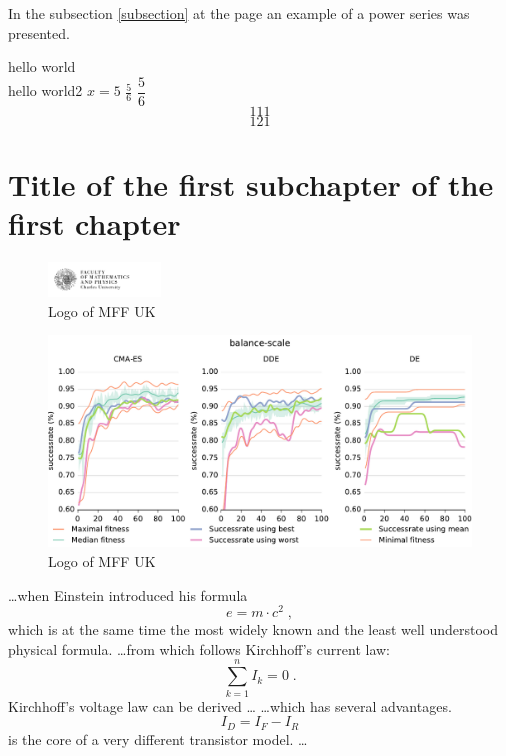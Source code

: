 \documentclass[12pt,a4paper]{report}
\begin{document}
 
In the subsection \ref{subsection} at the page \pageref{eq:1} an 
example of a power series was presented.


hello world \\ hello world2
$x=5$
$\frac{5}{6}$
$\dfrac{5}{6}$
\[111\]
$$121$$


\cite{bellet2013survey}

\section{Title of the first subchapter of the first chapter}


\begin{figure}[ht]
    \centering
    \includegraphics[width=30mm]{img/logo-en}
    \caption{Logo of MFF UK}
    \label{fig:mff}
\end{figure}


 \begin{figure}[ht] \label{fig:foo}
 	\centering
     \includegraphics[width=1.0\textwidth]{img/balance-scale}
     \caption{Logo of MFF UK}
 \end{figure}



\ldots when Einstein introduced his formula
\begin{equation}
e = m \cdot c^2 \; ,
\end{equation}
which is at the same time the most widely known
and the least well understood physical formula.
\ldots from which follows Kirchhoff’s current law:
\begin{equation}
\sum_{k=1}^{n} I_k = 0 \; .
\end{equation}
Kirchhoff’s voltage law can be derived \ldots
\ldots which has several advantages.
\begin{equation}
I_D = I_F - I_R
\end{equation}
is the core of a very different transistor model. \ldots
\end{document}
